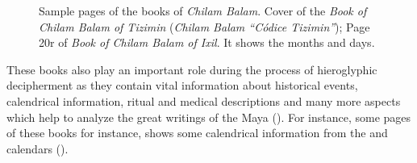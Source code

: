 \documentclass[../main.tex]{subfiles}
\begin{document}
\begin{figure}[ht]
    \centering
    \hfill
    \caption[Sample pages of the books of \emph{Chilam Balam}]{Sample pages of the books of 
             \emph{Chilam Balam}.
              Cover of the 
             \emph{Book of Chilam Balam of Tizimin} (\emph{Chilam Balam ``C\'odice Tizimin''});
              Page 20r of 
             \emph{Book of Chilam Balam of Ixil}. It shows the \haab months and \tzolkin days.}
\end{figure}
These books also play an important role during the process of hieroglyphic decipherment as they 
contain vital information about historical events, calendrical information, ritual and 
medical descriptions and many more aspects which help to analyze the great writings of the 
Maya (\cite[3\psq]{roys1933}).
For instance, some pages of these books for instance, shows some 
calendrical information from the \tzolkin and \haab calendars 
().
\end{document}
